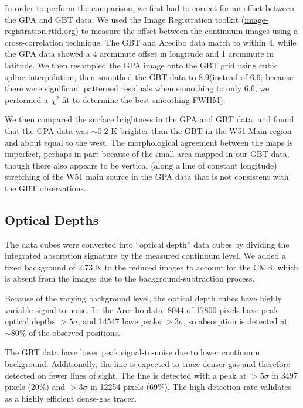 In order to perform the comparison, we first had to correct for an offset
between the GPA and GBT data.  We used the Image Registration toolkit
(\url{image-registration.rtfd.org}) to measure the offset between the continuum
images using a cross-correlation technique.
The GBT and Arecibo data match to within 4\arcsec, while the GPA data showed
a 4 arcminute offset in longitude and 1 arcminute in latitude.  We then resampled
the GPA image onto the GBT grid using cubic spline interpolation, then smoothed
the GBT data to 8.9\arcmin (instead of 6.6\arcmin; because there were significant
patterned residuals when smoothing to only 6.6\arcmin, we performed a $\chi^2$ fit
to determine the best smoothing FWHM).

We then compared the surface brightness in the GPA and GBT data, and found that
the GPA data was $\sim0.2$ K brighter than the GBT in the W51 Main region and
about equal to the west.  The morphological agreement between the maps is
imperfect, perhaps in part because of the small area mapped in our GBT data,
though there also appears to be vertical (along a line of constant longitude)
stretching of the W51 main source in the GPA data that is not consistent with
the GBT observations.


\subsection{Optical Depths}

The data cubes were converted into ``optical depth'' data cubes by dividing the
integrated \formaldehyde absorption signature by the measured continuum level.
We added a fixed background of 2.73 K to the reduced images to account for the
CMB, which is absent from the images due to the background-subtraction
process.

Because of the varying background level, the optical depth cubes have highly
variable signal-to-noise.  In the Arecibo data, 8044 of 17800 pixels have peak
optical depths $>5\sigma$, and 14547 have peaks $>3\sigma$, so \formaldehyde
absorption is detected at $\sim80\%$ of the observed positions.

The GBT \formaldehyde \twotwo data have lower peak signal-to-noise due to lower
continuum background.  Additionally, the \twotwo line is expected to trace
denser gas and therefore detected on fewer lines of sight.  The \twotwo line is
detected with a peak at $>5\sigma$ in 3497 pixels (20\%) and $>3\sigma$ in
12254 pixels (69\%).  The high detection rate validates \formaldehyde as a
highly efficient dense-gas tracer.

